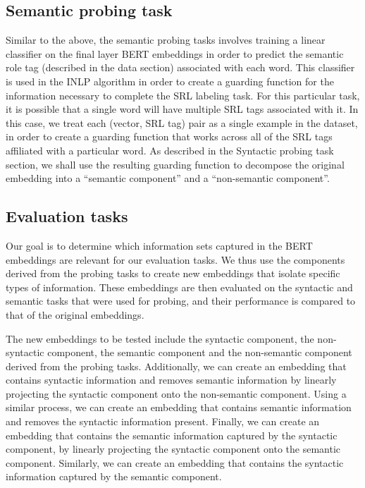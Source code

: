 \documentclass[11pt,a4paper]{article}
\begin{document}
\subsection{Semantic probing task}
\label{sec:semantics}

Similar to the above, the semantic probing tasks involves training a linear classifier on the final layer BERT embeddings in order to predict the semantic role tag (described in the data section) associated with each word. This classifier is used in the INLP algorithm in order to create a guarding function for the information necessary to complete the SRL labeling task. For this particular task, it is possible that a single word will have multiple SRL tags associated with it. In this case, we treat each (vector, SRL tag) pair as a single example in the dataset, in order to create a guarding function that works across all of the SRL tags affiliated with a particular word. As described in the Syntactic probing task section, we shall use the resulting guarding function to decompose the original embedding into a ``semantic component'' and a ``non-semantic component''. 

\subsection{Evaluation tasks}
\label{sec:eval}

Our goal is to determine which information sets captured in the BERT embeddings are relevant for our evaluation tasks. We thus use the components derived from the probing tasks to create new embeddings that isolate specific types of information. These embeddings are then evaluated on the syntactic and semantic tasks that were used for probing, and their performance is compared to that of the original embeddings. 

The new embeddings to be tested include the syntactic component, the non-syntactic component, the semantic component and the non-semantic component derived from the probing tasks. Additionally, we can create an embedding that contains syntactic information and removes semantic information by linearly projecting the syntactic component onto the non-semantic component. Using a similar process, we can create an embedding that contains semantic information and removes the syntactic information present. Finally, we can create an embedding that contains the semantic information captured by the syntactic component, by linearly projecting the syntactic component onto the semantic component. Similarly, we can create an embedding that contains the syntactic information captured by the semantic component. 
\end{document}
